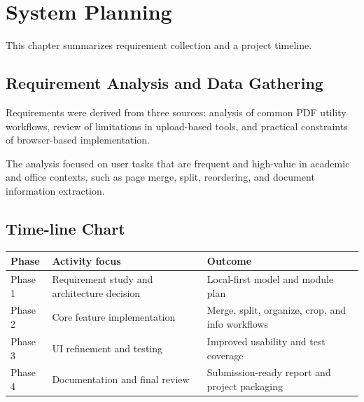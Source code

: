 \section{System Planning}
This chapter summarizes requirement collection and a project timeline.

\subsection{Requirement Analysis and Data Gathering}
Requirements were derived from three sources: analysis of common PDF utility workflows, review of limitations in upload-based tools, and practical constraints of browser-based implementation.

The analysis focused on user tasks that are frequent and high-value in academic and office contexts, such as page merge, split, reordering, and document information extraction.

\subsection{Time-line Chart}
\begin{longtable}{p{}p{}p{}}
\toprule
Phase & Activity focus & Outcome \\
\midrule
Phase 1 & Requirement study and architecture decision & Local-first model and module plan \\
Phase 2 & Core feature implementation & Merge, split, organize, crop, and info workflows \\
Phase 3 & UI refinement and testing & Improved usability and test coverage \\
Phase 4 & Documentation and final review & Submission-ready report and project packaging \\
\bottomrule
\end{longtable}
